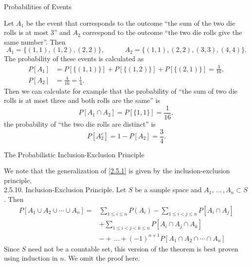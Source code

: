 \documentclass[smaller,hyperref={CJKbookmarks=true}]{beamer}
\newcounter{zhuo}[subsection]
\begin{document}
\begin{frame}{Probabilities of Events}
\newpage
\begin{spacing}{0.5}
Let $A_1$ be the event that corresponds to the outcome ``the sum of the two die rolls is at most 3'' and $A_2$ correspond to the outcome ``the two die rolls give the same number''. Then
\[A_1=\{(1,1),(1,2),(2,2)\},\qquad\quad
A_2=\{(1,1),(2,2),(3,3),(4,4)\}.\]
The probability of these events is calculated as
\begin{align*}
  P[A_1] &=P[\{(1,1)\}]+P[\{(1,2)\}]+P[\{(2,1)\}]=\frac{3}{16}, \\
  P[A_2] &=\frac{4}{16}=\frac{1}{4}.
\end{align*}
Then we can calculate for example that the probability of ``the sum of two
die rolls is at most three and both rolls are the same'' is
\[P[A_1\cap A_2]=P[\{1,1\}]=\frac{1}{16},\]
the probability of ``the two die rolls are distinct'' is
\[P[A_2^c]=1-P[A_2]=\frac{3}{4}.\]
\end{spacing}
\end{frame}
\begin{frame}[t]{The Probabilistic Inclusion-Exclusion Principle}
\begin{spacing}{1.05}
We note that the generalization of \eqref{2.5.1} is given by the inclusion-exclusion principle,\\[6pt]
\alert{2.5.10. Inclusion-Exclusion Principle.} Let $S$ be a sample space and $A_1,\,...\,,A_n\subset S$. Then
\begin{equation}\label{2.5.3}
\begin{split}
P[A_1\cup A_2\cup\cdots\cup A_n]=&\sum_{1\leq i\leq n}P(A_i)-\sum_{1\leq i<j\leq n}P[A_i\cap A_j]\\
     &+\sum_{1\leq i<j<k\leq n}P[A_i\cap A_j\cap A_k] \\
     &-+\,...+(-1)^{n+1}P[A_1\cap A_2\cap\cdots\cap A_n]
\end{split}
\end{equation}
Since $S$ need not be a countable set, this version of the theorem is best
proven using induction in $n$. We omit the proof here.
\end{spacing}
\end{frame}
\end{document}
